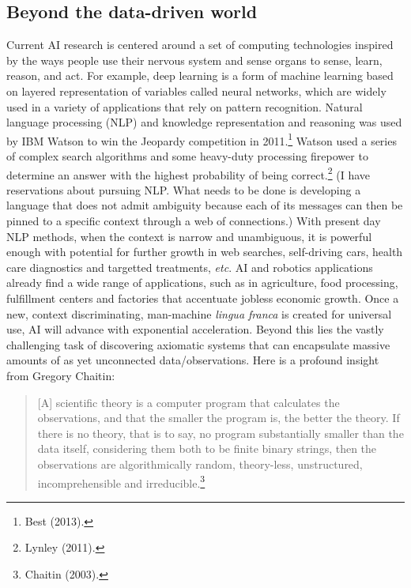 \begin{multicols}{2}
\subsection{Beyond the data-driven world}

Current AI research is centered around a set of computing technologies inspired by the ways people use their nervous system and sense organs to sense, learn, reason, and act. For example, deep learning is a form of machine learning based on layered representation of variables called neural networks, which are widely used in a variety of applications that rely on pattern recognition. Natural language processing (NLP) and knowledge representation and reasoning was used by IBM Watson to win the Jeopardy competition in 2011.\footnote{Best (2013).} Watson used a series of complex search algorithms and some heavy-duty processing firepower to determine an answer with the highest probability of being correct.\footnote{Lynley (2011).} (I have reservations about pursuing NLP. What needs to be done is developing a language that does not admit ambiguity because each of its messages can then be pinned to a specific context through a web of connections.) With present day NLP methods, when the context is narrow and unambiguous, it is powerful enough with potential for further growth in web searches, self-driving cars, health care diagnostics and targetted treatments, \textit{etc}. AI and robotics applications already find a wide range of applications, such as in agriculture, food processing, fulfillment centers and factories that accentuate jobless economic growth. Once a new, context discriminating, man-machine \textit{lingua franca} is created for universal use, AI will advance with exponential acceleration. Beyond this lies the vastly challenging task of discovering axiomatic systems that can encapsulate massive amounts of as yet unconnected data/observations. Here is a profound insight from Gregory Chaitin:
\begin{quote}
[A] scientific theory is a computer program that calculates the observations, and that the smaller the program is, the better the theory. If there is no theory, that is to say, no program substantially smaller than the data itself, considering them both to be finite binary strings, then the observations are algorithmically random, theory-less, unstructured, incomprehensible and irreducible.\footnote{Chaitin (2003).}
\end{quote}


\end{multicols}
